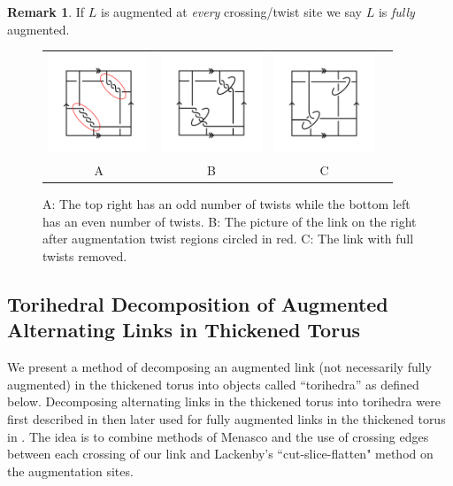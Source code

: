 \documentclass[11pt]{amsart}
\theoremstyle{plain}
\theoremstyle{definition}
\newtheorem{remark}[theorem]{Remark}
\begin{document}
\begin{remark}
If $L$ is augmented at \emph{every} crossing/twist site we say $L$ is \emph{fully} augmented.
\end{remark}

\begin{figure}
\centering
\begin{tabular}{cccc}
\includegraphics[width=3cm]{fig1.png}&
\includegraphics[width=3cm]{twist-augment.png}&
\includegraphics[width=3cm]{fig-2.png}\\
A&B&C
\end{tabular}
	 \caption{A: The top right has an odd number of twists while the bottom left has
	 an even number of twists. B: The picture of the link on the right after
	 augmentation twist regions circled in red. C: The link with full twists
	 removed.}
\label{fig:Augmentations}
\end{figure}

\subsection{Torihedral Decomposition of Augmented Alternating Links in Thickened Torus}


We present a method of decomposing an augmented link (not necessarily fully augmented) 
in the thickened torus into
objects called ``torihedra'' as defined below.  Decomposing alternating links in the thickened torus into 
torihedra were first described in \cite{CKP2} then later used for fully augmented links in 
the thickened torus in \cite{kwon2020fully}.
The idea is to combine methods of Menasco
\cite{Menasco} and the use of crossing edges between each crossing of our link
and Lackenby's ``cut-slice-flatten" method \cite{lackenby} on the augmentation
sites.
\end{document}
